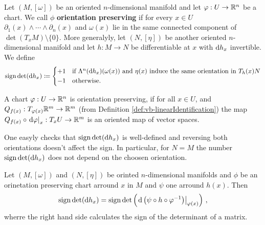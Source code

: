 \begin{definition}
Let $(M,[\omega])$ be an oriented $n$-dimensional manifold and let $\varphi:U\to \mathbb{R}^n$ be a chart. We call $\phi$ \textbf{orientation preserving} if for every $x\in U$ $\partial_1(x)\wedge\cdots \wedge \partial_n(x)$ and $\omega(x)$ lie in the same connected component of $\det(T_xM)\setminus\{0\}$. More generalyly, let $(N,[\eta])$ be another oriented $n$-dimensional manifold and let $h:M\to N$ be differentiable at $x$ with $\mathop{}\!\mathrm{d} h_x$ invertible. We define 
\begin{equation*}
    \sign \det(\diff h _x)\coloneq \begin{cases*}
        +1& if $\Lambda^n(\diff h_x)(\omega (x))$ and $\eta (x)$ induce the same orientation in $T_h(x)N$\\
        -1& otherwise.
    \end{cases*}
\end{equation*}
\end{definition}
\begin{corollary}
    A chart $\varphi:U\to \mathbb{R}^n$ is orientation preserving, if for all $x\in U$, and $Q_{f(x)}:T_{\varphi(x)}\mathbb{R}^m \to \mathbb{R}^m$ (from Definition \ref{def:vb-linearIdentification}) the map $Q_{f(x)}\circ \left.\mathop{}\!\mathrm{d} \varphi\right|_{x}:T_xU\to \mathbb{R}^m$ is an oriented map of vector spaces.
\end{corollary}
\begin{remark}
    One easyly checks that $  \mathrm{sign} \det(\mathop{}\!\mathrm{d} h _x)$ is well-defined and reversing both orientations doesn't affect the sign. In particular, for $N=M$ the number $  \mathrm{sign} \det(\mathop{}\!\mathrm{d} h _x)$ does not depend on the choosen orientation. 
\end{remark}
\begin{lemma}\label{lem:orient-computingSignInCharts}
    Let $(M,[\omega])$ and $(N,[\eta])$ be orinted $n$-dimensional manifolds and $\phi$ be an orinetation preserving chart arround $x$ in $M$ and $\psi$ one arround $h(x)$. Then
    \begin{equation*}
        \mathrm{sign}\det(\mathop{}\!\mathrm{d} h_x)=\mathrm{sign} \det \left(\left.\mathop{}\!\mathrm{d}\left(\psi\circ h\circ \varphi^{-1}\right)\right|_{\varphi(x)}\right)\,,
    \end{equation*} wherre the right hand side calculates the sign of the determinant of a matrix.
\end{lemma}
